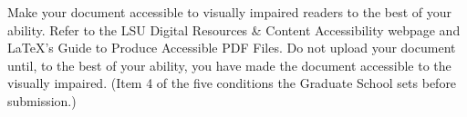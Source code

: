 %
%

%
	{Make your document accessible to visually impaired readers to the best of
	 your ability. Refer to the LSU Digital Resources \& Content Accessibility
	 webpage and LaTeX's Guide to Produce Accessible PDF Files.}
	{Do not upload your document until, to the best of your ability, you have
	 made the document accessible to the visually impaired. (Item 4 of the five
	 conditions the Graduate School sets before submission.)}

\newcommand{\thesis@lsu@priordegrees}{}
\newcommand{\lsupriordegrees}[1]{\renewcommand{\thesis@lsu@priordegrees}{#1}}

